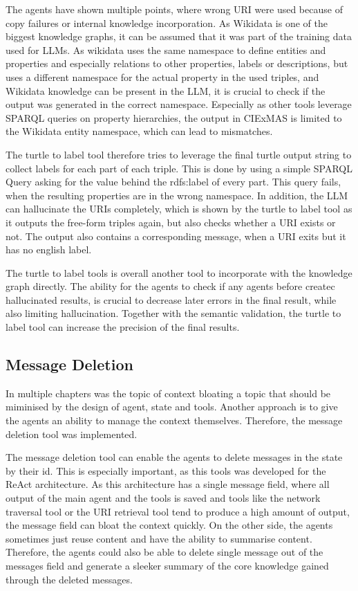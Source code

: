 \documentclass[a4paper,oneside,bibliography=totoc]{scrbook}
\begin{document}
The agents have shown multiple points, where wrong URI were used because of copy failures or internal knowledge incorporation. As Wikidata is one of the biggest knowledge graphs, it can be assumed that it was part of the training data used for \acp{LLM}. As wikidata uses the same namespace to define entities and properties and especially relations to other properties, labels or descriptions, but uses a different namespace for the actual property in the used triples, and Wikidata knowledge can be present in the \ac{LLM}, it is crucial to check if the output was generated in the correct namespace. Especially as other tools leverage SPARQL queries on property hierarchies, the output in CIExMAS is limited to the Wikidata entity namespace, which can lead to mismatches.

The turtle to label tool therefore tries to leverage the final turtle output string to collect labels for each part of each triple. This is done by using a simple SPARQL Query asking for the value behind the rdfs:label of every part. This query fails, when the resulting properties are in the wrong namespace. In addition, the \ac{LLM} can hallucinate the URIs completely, which is shown by the turtle to label tool as it outputs the free-form triples again, but also checks whether a URI exists or not. The output also contains a corresponding message, when a URI exits but it has no english label.

The turtle to label tools is overall another tool to incorporate with the knowledge graph directly. The ability for the agents to check if any agents before createc hallucinated results, is crucial to decrease later errors in the final result, while also limiting hallucination. Together with the semantic validation, the turtle to label tool can increase the precision of the final results.

\subsection{Message Deletion}
\label{subsec:message_deletion}

In multiple chapters was the topic of context bloating a topic that should be miminised by the design of agent, state and tools. Another approach is to give the agents an ability to manage the context themselves. Therefore, the message deletion tool was implemented.

The message deletion tool can enable the agents to delete messages in the state by their id. This is especially important, as this tools was developed for the ReAct architecture. As this architecture has a single message field, where all output of the main agent and the tools is saved and tools like the network traversal tool or the URI retrieval tool tend to produce a high amount of output, the message field can bloat the context quickly. On the other side, the agents sometimes just reuse content and have the ability to summarise content. Therefore, the agents could also be able to delete single message out of the messages field and generate a sleeker summary of the core knowledge gained through the deleted messages.
\end{document}
